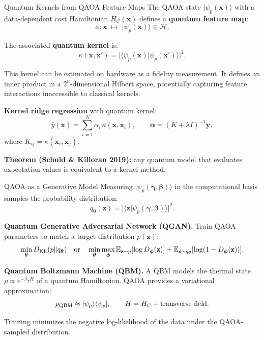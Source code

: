 \documentclass{beamer}
\begin{document}

\begin{frame}{Quantum Kernels from QAOA Feature Maps}
The QAOA state $|\psi_p(\mathbf{x})\rangle$ with a data-dependent
cost Hamiltonian $H_C(\mathbf{x})$ defines a \textbf{quantum feature map}:
\[
\phi:\mathbf{x} \;\longmapsto\; |\psi_p(\mathbf{x})\rangle \in \mathcal{H}.
\]

The associated \textbf{quantum kernel} is:
\[
\kappa(\mathbf{x},\mathbf{x}')
= \bigl|\langle\psi_p(\mathbf{x})|\psi_p(\mathbf{x}')\rangle\bigr|^2.
\]

This kernel can be estimated on hardware as a fidelity measurement.
It defines an inner product in a $2^n$-dimensional Hilbert space,
potentially capturing feature interactions inaccessible to classical kernels.

\medskip

\textbf{Kernel ridge regression} with quantum kernel:
\[
\hat{y}(\mathbf{x}) = \sum_{i=1}^N \alpha_i\,\kappa(\mathbf{x},\mathbf{x}_i),
\qquad
\boldsymbol{\alpha} = (K + \lambda I)^{-1}\mathbf{y},
\]
where $K_{ij} = \kappa(\mathbf{x}_i,\mathbf{x}_j)$.

\textbf{Theorem (Schuld \& Killoran 2019):} any quantum model that
evaluates expectation values is equivalent to a kernel method.
\end{frame}


\begin{frame}{QAOA as a Generative Model}
Measuring $|\psi_p(\boldsymbol{\gamma},\boldsymbol{\beta})\rangle$ in
the computational basis samples the probability distribution:
\[
q_{\boldsymbol{\theta}}(\mathbf{z})
= |\langle\mathbf{z}|\psi_p(\boldsymbol{\gamma},\boldsymbol{\beta})\rangle|^2.
\]

\textbf{Quantum Generative Adversarial Network (QGAN).}
Train QAOA parameters to match a target distribution $p(\mathbf{z})$:
\[
\min_{\boldsymbol{\theta}}
D_{\rm KL}(p \| q_{\boldsymbol{\theta}})
\quad\text{or}\quad
\min_{\boldsymbol{\theta}}\max_{\boldsymbol{\phi}}
\mathbb{E}_{\mathbf{z}\sim p}[\log D_{\boldsymbol{\phi}}(\mathbf{z})]
+ \mathbb{E}_{\mathbf{z}\sim q_{\boldsymbol{\theta}}}[\log(1-D_{\boldsymbol{\phi}}(\mathbf{z}))].
\]

\textbf{Quantum Boltzmann Machine (QBM).}
A QBM models the thermal state $\rho \propto e^{-\beta_T H}$ of a
quantum Hamiltonian. QAOA provides a variational approximation:
\[
\rho_{\rm QBM} \approx |\psi_p\rangle\langle\psi_p|,
\qquad
H = H_C + \text{transverse field}.
\]

Training minimizes the negative log-likelihood of the data under
the QAOA-sampled distribution.
\end{frame}
\end{document}
